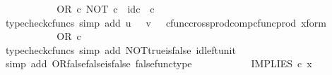 \begin{isabellebody}
\ \ \ \ \ \ \isamarkupfalse%
\ \isamarkupfalse%
\ {\isachardoublequoteopen}{\isachardot}{\kern0pt}{\isachardot}{\kern0pt}{\isachardot}{\kern0pt}\ {\isacharequal}{\kern0pt}\ OR\ {\isasymcirc}\isactrlsub c\ {\isasymlangle}NOT\ {\isasymcirc}\isactrlsub c\ {\isasymt}{\isacharcomma}{\kern0pt}\ id\isactrlsub c\ {\isasymOmega}\ {\isasymcirc}\isactrlsub c\ {\isasymf}{\isasymrangle}{\isachardoublequoteclose}\isanewline
\ \ \ \ \ \ \ \ \isamarkupfalse%
\ {\isacharparenleft}{\kern0pt}typecheck{\isacharunderscore}{\kern0pt}cfuncs{\isacharcomma}{\kern0pt}\ simp\ add{\isacharcolon}{\kern0pt}\ {\isacartoucheopen}u\ {\isacharequal}{\kern0pt}\ {\isasymt}{\isacartoucheclose}\ {\isacartoucheopen}v\ {\isacharequal}{\kern0pt}\ {\isasymf}{\isacartoucheclose}\ cfunc{\isacharunderscore}{\kern0pt}cross{\isacharunderscore}{\kern0pt}prod{\isacharunderscore}{\kern0pt}comp{\isacharunderscore}{\kern0pt}cfunc{\isacharunderscore}{\kern0pt}prod\ x{\isacharunderscore}{\kern0pt}form{\isacharparenright}{\kern0pt}\isanewline
\ \ \ \ \ \ \isamarkupfalse%
\ \isamarkupfalse%
\ {\isachardoublequoteopen}{\isachardot}{\kern0pt}{\isachardot}{\kern0pt}{\isachardot}{\kern0pt}\ {\isacharequal}{\kern0pt}\ OR\ {\isasymcirc}\isactrlsub c\ {\isasymlangle}{\isasymf}{\isacharcomma}{\kern0pt}\ {\isasymf}{\isasymrangle}{\isachardoublequoteclose}\isanewline
\ \ \ \ \ \ \ \ \isamarkupfalse%
\ {\isacharparenleft}{\kern0pt}typecheck{\isacharunderscore}{\kern0pt}cfuncs{\isacharcomma}{\kern0pt}\ simp\ add{\isacharcolon}{\kern0pt}\ NOT{\isacharunderscore}{\kern0pt}true{\isacharunderscore}{\kern0pt}is{\isacharunderscore}{\kern0pt}false\ id{\isacharunderscore}{\kern0pt}left{\isacharunderscore}{\kern0pt}unit{}{\isacharparenright}{\kern0pt}\isanewline
\ \ \ \ \ \ \isamarkupfalse%
\ \isamarkupfalse%
\ {\isachardoublequoteopen}{\isachardot}{\kern0pt}{\isachardot}{\kern0pt}{\isachardot}{\kern0pt}\ {\isacharequal}{\kern0pt}\ {\isasymf}{\isachardoublequoteclose}\isanewline
\ \ \ \ \ \ \ \ \isamarkupfalse%
\ {\isacharparenleft}{\kern0pt}simp\ add{\isacharcolon}{\kern0pt}\ OR{\isacharunderscore}{\kern0pt}false{\isacharunderscore}{\kern0pt}false{\isacharunderscore}{\kern0pt}is{\isacharunderscore}{\kern0pt}false\ false{\isacharunderscore}{\kern0pt}func{\isacharunderscore}{\kern0pt}type{\isacharparenright}{\kern0pt}\isanewline
\ \ \ \ \ \ \isamarkupfalse%
\ \isamarkupfalse%
\ {\isachardoublequoteopen}{\isachardot}{\kern0pt}{\isachardot}{\kern0pt}{\isachardot}{\kern0pt}\ {\isacharequal}{\kern0pt}\ IMPLIES\ {\isasymcirc}\isactrlsub c\ x{\isachardoublequoteclose}\isanewline

\end{isabellebody}
